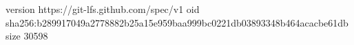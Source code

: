 version https://git-lfs.github.com/spec/v1
oid sha256:b289917049a2778882b25a15e959baa999bc0221db03893348b464acacbe61db
size 30598

